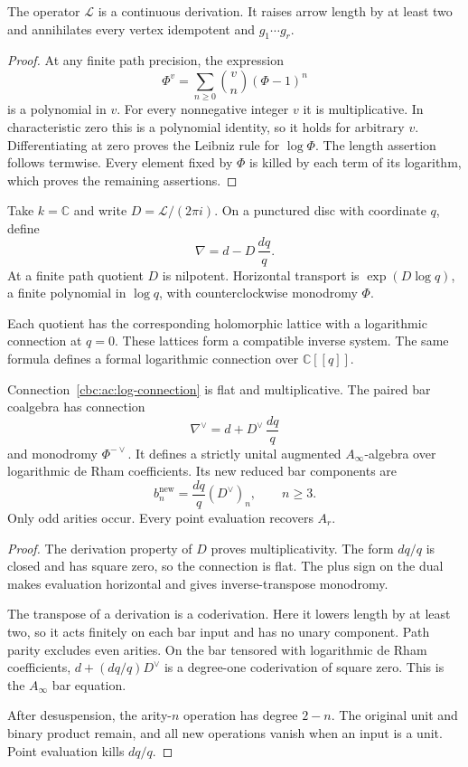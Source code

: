 \begin{lemma}\label{cbc:ac:log-derivation}
The operator $\mathcal L$ is a continuous
derivation. It raises arrow length by at
least two and annihilates every vertex
idempotent and $g_1\cdots g_r$.
\end{lemma}
\begin{proof}
At any finite path precision, the expression
\[
 \Phi^v=\sum_{n\geq0}\binom vn(\Phi-1)^n
\]
is a polynomial in $v$. For every nonnegative
integer $v$ it is multiplicative. In
characteristic zero this is a polynomial
identity, so it holds for arbitrary $v$.
Differentiating at zero proves the Leibniz
rule for $\log\Phi$.
The length assertion follows termwise.
Every element fixed by $\Phi$ is killed
by each term of its logarithm, which proves
the remaining assertions.
\end{proof}

Take $k=\mathbb C$ and write
$D=\mathcal L/(2\pi i)$. On a punctured
disc with coordinate $q$, define
\begin{equation}\label{cbc:ac:log-connection}
 \nabla=d-D\,\frac{dq}{q}.
\end{equation}
At a finite path quotient $D$ is nilpotent.
Horizontal transport is
$\exp(D\log q)$, a finite polynomial in
$\log q$, with counterclockwise monodromy
$\Phi$.

Each quotient has the corresponding
holomorphic lattice with a logarithmic
connection at $q=0$. These lattices form
a compatible inverse system. The same
formula defines a formal logarithmic
connection over $\mathbb C[[q]]$.

\begin{theorem}\label{cbc:ac:log-family}
Connection~\eqref{cbc:ac:log-connection} is
flat and multiplicative. The paired bar
coalgebra has connection
\[
 \nabla^\vee=d+D^\vee\,\frac{dq}{q}
\]
and monodromy $\Phi^{-\vee}$.
It defines a strictly unital augmented
$A_\infty$-algebra over logarithmic de Rham
coefficients. Its new reduced bar components
are
\[
 b_n^{\mathrm{new}}=\frac{dq}{q}(D^\vee)_n,
                         \qquad n\geq3.
\]
Only odd arities occur. Every point
evaluation recovers $A_r$.
\end{theorem}
\begin{proof}
The derivation property of $D$ proves
multiplicativity. The form $dq/q$ is
closed and has square zero, so the
connection is flat. The plus sign on
the dual makes evaluation horizontal
and gives inverse-transpose monodromy.

The transpose of a derivation is a
coderivation. Here it lowers length by
at least two, so it acts finitely on
each bar input and has no unary
component. Path parity excludes even
arities. On the bar tensored with
logarithmic de Rham coefficients,
$d+(dq/q)D^\vee$ is a degree-one
coderivation of square zero. This is
the $A_\infty$ bar equation.

After desuspension, the arity-$n$
operation has degree $2-n$.
The original unit and binary product
remain, and all new operations vanish
when an input is a unit.
Point evaluation kills $dq/q$.
\end{proof}

